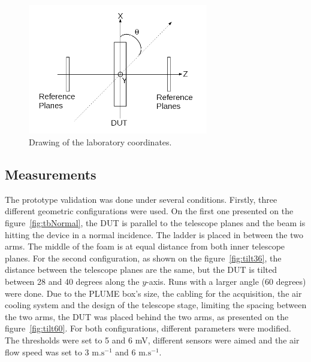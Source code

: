     \begin{figure}[!h]
      \centering
      \includegraphics[width = 0.7\textwidth]{Pictures/deformation/lab_frame.png}
      \caption{Drawing of the laboratory coordinates.}
      \label{fig:labCoordinates}
    \end{figure}

    \subsection{Measurements}

    The prototype validation was done under several conditions.
    Firstly, three different geometric configurations were used.
    On the first one presented on the figure~\ref{fig:tbNormal}, the \gls{DUT} is parallel to the telescope planes and the beam is hitting the device in a normal incidence.
    The ladder is placed in between the two arms.
    The middle of the foam is at equal distance from both inner telescope planes.
    For the second configuration, as shown on the figure~\ref{fig:tilt36}, the distance between the telescope planes are the same, but the \gls{DUT} is tilted between 28 and 40 degrees along the $y$-axis.
    Runs with a larger angle (60 degrees) were done.
    Due to the PLUME box's size, the cabling for the acquisition, the air cooling system and the design of the telescope stage, limiting the spacing between the two arms, the \gls{DUT} was placed behind the two arms, as presented on the figure~\ref{fig:tilt60}.
    For both configurations, different parameters were modified.
    The thresholds were set to 5 and 6 mV, different sensors were aimed and the air flow speed was set to 3 $\text{m.s}^{-1}$ and 6 $\text{m.s}^{-1}$.

